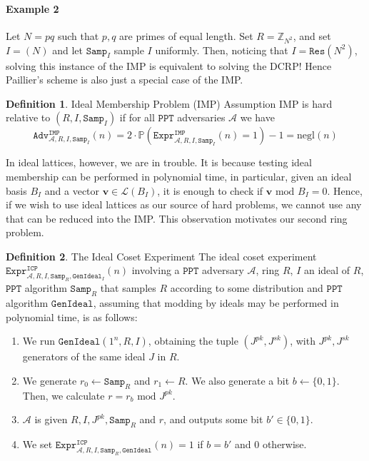 \documentclass{article}
\theoremstyle{definition}
\newtheorem{definition}{Definition}[section]
\theoremstyle{example}
\newcommand{\A}{\mathcal{A}}
\renewcommand{\L}{\mathcal{L}}
\newcommand{\Prob}{\mathbb{P}}
\newcommand{\Int}{\mathbb{Z}}
\newcommand{\PPT}{\texttt{PPT}}
\newcommand{\negl}{\text{negl}}
\renewcommand{\mod}{\,\,\text{mod}\,\,}
\newcommand{\Expr}[2]{\texttt{Expr}^{\texttt{#1}}_{#2}}
\newcommand{\Adv}[2]{\texttt{Adv}^{\texttt{#1}}_{#2}}
\newcommand{\GenIdeal}{\texttt{GenIdeal}}
\newcommand{\Samp}{\texttt{Samp}}
\renewcommand{\vec}[1]{\mathbf{#1}}
\begin{document}
\paragraph{Example 2}
  Let $N = pq$ such that $p, q$ are primes of equal length. Set $R =
  \Int_{N^2}$, and set $I = (N)$ and let $\Samp_I$ sample $I$ uniformly. Then,
  noticing that $I = \texttt{Res}(N^2)$, solving this instance of the IMP is equivalent to solving the DCRP! Hence
  Paillier's scheme is also just a special case of the IMP.
\begin{definition}{Ideal Membership Problem (IMP) Assumption}
  IMP is hard relative to $(R, I, \Samp_I)$ if for all $\PPT$ adversaries $\A$ we have
  \[
    \Adv{IMP}{\A, R, I, \Samp_I}(n) = 2 \cdot \Prob(\Expr{IMP}{\A, R, I, \Samp_I}(n) = 1) - 1 = \negl(n)
  \]
\end{definition}
In ideal lattices, however, we are in trouble. It is because testing ideal
membership can be performed in polynomial time, in particular, given an ideal basis
$B_I$ and a vector $\vec{v} \in \L(B_I)$, it is enough to check if $\vec{v}
\mod B_I = 0$. Hence, if we wish to use ideal lattices as our source of hard
problems, we cannot use any that can be reduced into the IMP. This observation
motivates our second ring problem.
\begin{definition}{The Ideal Coset Experiment} The ideal coset experiment
  $\Expr{ICP}{\A, R, I, \Samp_R, \GenIdeal_I}(n)$ involving a $\PPT$ adversary $\A$, ring
  $R$, $I$ an ideal of $R$, $\PPT$ algorithm $\Samp_R$ that samples $R$
  according to some distribution and $\PPT$ algorithm $\GenIdeal$, assuming that modding by ideals may be performed
  in polynomial time, is as follows:
  \begin{enumerate}
  \item We run $\GenIdeal(1^n, R, I)$, obtaining the tuple $(J^{pk}, J^{sk})$,
    with $J^{pk}, J^{sk}$ generators of the same ideal $J$ in $R$.
  \item We generate $r_0 \leftarrow \Samp_R$ and $r_1 \leftarrow R$.
    We also generate a bit $b \leftarrow \{0, 1\}$. Then, we calculate $r = r_b
    \mod J^{pk}$.
  \item $\A$ is given $R, I, J^{pk}, \Samp_R$ and $r$, and outputs some bit $b' \in \{0, 1\}$.
  \item We set $\Expr{ICP}{\A, R, I, \Samp_R, \GenIdeal}(n) = 1$ if $b = b'$ and $0$ otherwise.
  \end{enumerate}
\end{definition}
\end{document}
